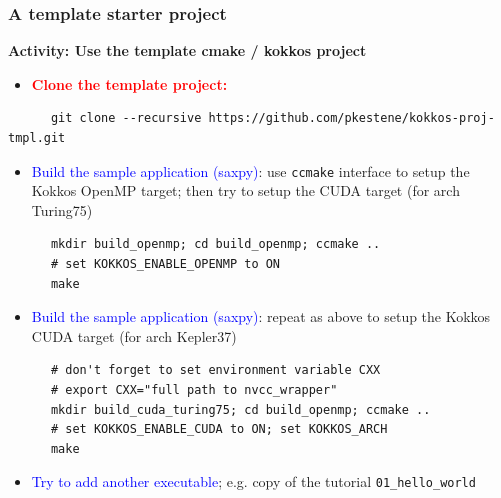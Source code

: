 \begin{frame}[fragile=singleslide]
  \frametitle{A template starter project}

  {\large \bf Activity: Use the template cmake / kokkos project}

  \begin{itemize}
  \item \textcolor{red}{\bf Clone the template project:}
  \end{itemize}
  {\small
    \begin{verbatim}
      git clone --recursive https://github.com/pkestene/kokkos-proj-tmpl.git
    \end{verbatim}
  }
  \begin{itemize}
  \item \textcolor{blue}{Build the sample application (saxpy)}: use \texttt{ccmake} interface to setup the Kokkos OpenMP target; then try to setup the CUDA target (for arch Turing75)
  \end{itemize}
  {\small
    \begin{verbatim}
      mkdir build_openmp; cd build_openmp; ccmake ..
      # set KOKKOS_ENABLE_OPENMP to ON
      make
    \end{verbatim}
  }
  \begin{itemize}
  \item \textcolor{blue}{Build the sample application (saxpy)}: repeat as above to setup the Kokkos CUDA target (for arch Kepler37)
  \end{itemize}
  {\small
    \begin{verbatim}
      # don't forget to set environment variable CXX
      # export CXX="full path to nvcc_wrapper"
      mkdir build_cuda_turing75; cd build_openmp; ccmake ..
      # set KOKKOS_ENABLE_CUDA to ON; set KOKKOS_ARCH
      make
    \end{verbatim}
  }
  \begin{itemize}
  \item \textcolor{blue}{Try to add another executable}; e.g. copy of the tutorial \texttt{01\_hello\_world}
  \end{itemize}

\end{frame}
